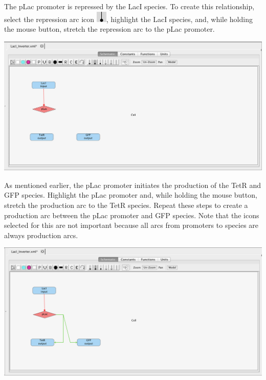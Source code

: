 \documentclass[titlepage,11pt]{article}
\begin{document}
The pLac promoter is repressed by the LacI species.  To create this relationship, select the repression arc icon 
\includegraphics{../gui/icons/modelview/inhibition_selected}, highlight the LacI species, and, while holding the mouse button, stretch the repression arc to the pLac promoter.  

\begin{center}
\includegraphics[width=160mm]{screenshots/repressionGT} 
\end{center}

As mentioned earlier, the pLac promoter initiates the production of the TetR and GFP species.  Highlight the pLac promoter and, while holding the mouse button, stretch the production arc to the TetR species.  Repeat these steps to create a production arc between the pLac promoter and GFP species.  Note that the icons selected for this are not important because all arcs from promoters to species are always production arcs.  

\begin{center}
\includegraphics[width=160mm]{screenshots/productionGT}
\end{center}
\end{document}

